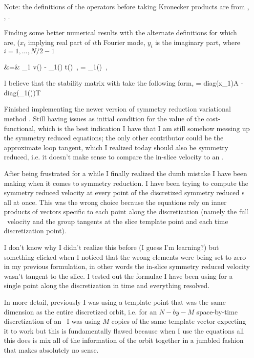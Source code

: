 Note: the definitions of the operators before taking Kronecker products are from , , .

Finding some better numerical results with the alternate definitions for
 which are, ($x_i$ implying real part of $i$th Fourier mode,
$y_i$ is the imaginary part, where $i = 1, ..., N/2-1$

\bea
     &=&
                _1 v() - _1() t() \,, \quad
     = _1()
                   \,, \quad
    \label{e-symred2}
\eea

I believe that the stability matrix with take the following form,
\beq
{} = diag(x_1)\cdot A - diag(_1())\cdot T
\eeq


Finished implementing the newer version of symmetry reduction variational method
.
Still having issues as initial condition for the value of the cost-functional, which
is the best indication I have that I am still somehow messing up the symmetry reduced equations;
the only other contributor could be the approximate loop tangent, which I realized today
should also be symmetry reduced, i.e. it doesn't make sense to compare the in-slice velocity
to an .

After being frustrated for a while I finally realized the dumb mistake I have been making
when it comes to symmetry reduction. I have been trying to compute the symmetry reduced
velocity at every point of the discretized symmetry reduced {\rpo}s all at once. This was
the wrong choice because the equations rely on inner products of vectors specific to each point
along the discretization (namely the full \statesp\ velocity and the group tangents at
the slice template point and each time discretization point).

I don't know why I didn't realize this before (I guess I'm learning?) but something clicked
when I noticed that the wrong elements were being set to zero in my previous formulation, in other
words the in-slice symmetry reduced velocity wasn't tangent to the slice.
I tested out the formulae I have been using for a single point along the discretization in time and everything resolved.

In more detail, previously I was using a template point that was the same dimension as the entire discretized
orbit, i.e. for an $N-by-M$ space-by-time discretization of an \rpo\ I was using $M$ copies
of the same template vector expecting it to work but this is fundamentally flawed because
when I use the equations  all this does is mix all of the information of
the orbit together in a jumbled fashion that makes absolutely no sense.

